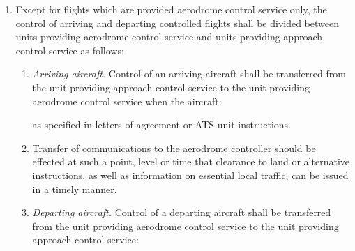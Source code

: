 \documentclass[../vATM.tex]{subfiles}
\begin{document}
    \begin{enumerate}
        \item Except for flights which are provided aerodrome control service only, the control of arriving and departing controlled flights shall be divided between units providing aerodrome control service and units providing approach control service as follows:
        
        \begin{enumerate}
            \item \textit{Arriving aircraft.} Control of an arriving aircraft shall be transferred from the unit providing approach control service to the unit providing aerodrome control service when the aircraft:
            
            
            \noindent as specified in letters of agreement or ATS unit instructions.
            
            \item \label{4.3.2.1.2} Transfer of communications to the aerodrome controller should be effected at such a point, level or time that clearance to land or alternative instructions, as well as information on essential local traffic, can be issued in a timely manner.
            
            \item \textit{Departing aircraft.} Control of a departing aircraft shall be transferred from the unit providing aerodrome control service to the unit providing approach control service:


\end{enumerate}
\end{enumerate}
\end{document}
